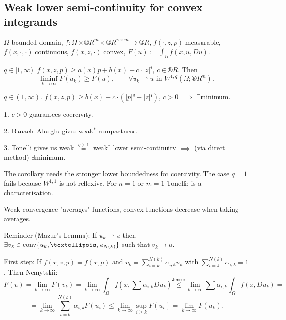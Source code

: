 \documentclass[12pt]{article}					%
\begin{document}
\subsection{Weak lower semi-continuity for convex integrands}
\begin{veta}[Tonelli]
	$Ω$ bounded domain, $f: Ω \times ®R^m \times ®R^{n \times m} \rightarrow ®R$, $f(·, z, p)$ measurable, $f(x, ·, ·)$ continuous, $f(x, z, ·)$ convex, $F(u) := \int_Ω f(x, u, Du)$.

	$q \in [1, ∞)$, $f(x, z, p) ≥ a(x)p + b(x) + c·|z|^q$, $c \in ®R$. Then
	$$ \liminf_{k \rightarrow ∞} F(u_k) ≥ F(u), \qquad \forall u_k \rightharpoonup u \text{ in } W^{1, q}(Ω; ®R^m). $$

	\begin{dusledekin}
		$q \in (1, ∞)$. $f(x, z, p) ≥ b(x) + c·(|p|^q + |z|^q)$, $c > 0$ $\implies$ $\exists$minimum.
	\end{dusledekin}

	\begin{dukazin}[Of corollary]
		1. $c > 0$ guarantees coercivity.

		2. Banach–Alaoglu gives weak$^*$-compactness.

		3. Tonelli gives us weak $\overset{q > 1}=$ weak$^*$ lower semi-continuity $\implies$ (via direct method) $\exists$minimum.
	\end{dukazin}

	\begin{poznamkain}
		The corollary needs the stronger lower boundedness for coercivity. The case $q = 1$ fails because $W^{1, 1}$ is not reflexive. For $n = 1$ or $m = 1$ Tonelli: is a characterization.
	\end{poznamkain}

\begin{dukazin}[sketch]
	Weak convergence "averages" functions, convex functions decrease when taking averages.

	Reminder (Mazur's Lemma): If $u_k \rightharpoonup u$ then $\exists v_k \in \conv\{u_k, …, u_{N(k)}\}$ such that $v_k \rightarrow u$.

	First step: If $f(x, z, p) = f(x, p)$ and $v_k = \sum_{i=k}^{N(k)} α_{i, k} u_k$ with $\sum_{i=k}^{N(k)} α_{i, k} = 1$. Then Nemytskii:
	$$ F(u) = \lim_{k \rightarrow ∞} F(v_k) = \lim_{k \rightarrow ∞} \int_Ω f(x, \sum α_{i, k} Du_k) \overset{\text{Jensen}}≤ \lim_{k \rightarrow ∞} \sum α_{i, k} \int_Ω f(x, Du_k) = $$
	$$ = \lim_{k \rightarrow ∞} \sum_{i=k}^{N(k)} α_{i, k} F(u_i) ≤ \lim_{k \rightarrow ∞} \sup_{i ≥ k} F(u_i) = \lim_{k \rightarrow ∞} F(u_k). $$


\end{dukazin}
\end{veta}
\end{document}
